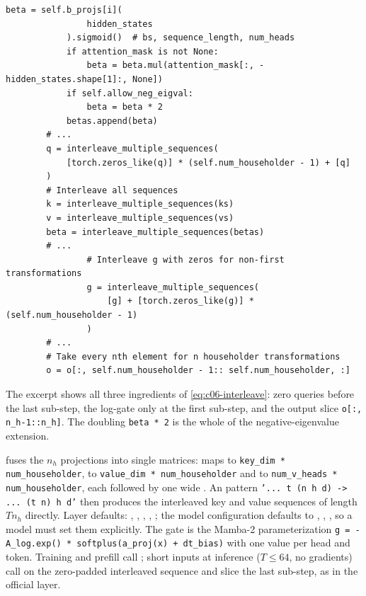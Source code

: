 \begin{lstlisting}[caption={Excerpt from \texttt{repos/\allowbreak{}automl\_\_DeltaProduct/\allowbreak{}flash-linear-attention/\allowbreak{}fla/\allowbreak{}layers/\allowbreak{}gated\_deltaproduct.py}},label={lst:c06-dp-official}]
            beta = self.b_projs[i](
                hidden_states
            ).sigmoid()  # bs, sequence_length, num_heads
            if attention_mask is not None:
                beta = beta.mul(attention_mask[:, -hidden_states.shape[1]:, None])
            if self.allow_neg_eigval:
                beta = beta * 2
            betas.append(beta)
        # ...
        q = interleave_multiple_sequences(
            [torch.zeros_like(q)] * (self.num_householder - 1) + [q]
        )
        # Interleave all sequences
        k = interleave_multiple_sequences(ks)
        v = interleave_multiple_sequences(vs)
        beta = interleave_multiple_sequences(betas)
        # ...
                # Interleave g with zeros for non-first transformations
                g = interleave_multiple_sequences(
                    [g] + [torch.zeros_like(g)] * (self.num_householder - 1)
                )
        # ...
        # Take every nth element for n householder transformations
        o = o[:, self.num_householder - 1:: self.num_householder, :]
\end{lstlisting}

The excerpt shows all three ingredients of \eqref{eq:c06-interleave}: zero queries before the
last sub-step, the log-gate  only at the first sub-step, and the output slice
\texttt{o[:, n\_h-1::n\_h]}. The doubling \texttt{beta * 2} is the whole of the negative-eigenvalue
extension.

\begin{implnote}[title={In the code: the maintained \fla{} layer}]
 fuses the
$n_h$ projections into single matrices:  maps  to
\texttt{key\_dim * num\_householder},  to \texttt{value\_dim * num\_householder} and
 to \texttt{num\_v\_heads * num\_householder}, each followed by one wide
. An  pattern \texttt{'... t (n h d) -> ... (t n) h d'}
then produces the interleaved key and value sequences of length $Tn_h$ directly. Layer
defaults: , ,
, , ; the model configuration
 defaults to ,
, , so a model must set them
explicitly. The gate is the Mamba-2 parameterization
\texttt{g = -A\_log.exp() * softplus(a\_proj(x) + dt\_bias)} with one value per head and token.
Training and prefill call ; short inputs at inference
($T\le64$, no gradients) call  on the zero-padded
interleaved sequence and slice the last sub-step, as in the official layer.
\end{implnote}

